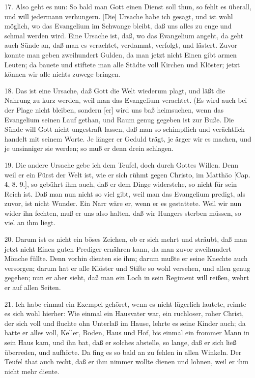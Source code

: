 17. Also geht es nun: So bald man Gott einen Dienst soll thun, so fehlt es überall, und will jedermann verhungern. [Die] Ursache habe ich gesagt, und ist wohl möglich, wo das Evangelium im Schwange bleibt, daß uns alles zu enge und schmal werden wird. Eine Ursache ist, daß, wo das Evangelium angeht, da geht auch Sünde an, daß man es verachtet, verdammt, verfolgt, und lästert. Zuvor konnte man geben zweihundert Gulden, da man jetzt nicht Einen gibt armen Leuten; da bauete und stiftete man alle Städte voll Kirchen und Klöster; jetzt können wir alle nichts zuwege bringen.

18. Das ist eine Ursache, daß Gott die Welt wiederum plagt, und läßt die Nahrung zu kurz werden, weil man das Evangelium verachtet. (Es wird auch bei der Plage nicht bleiben, sondern [er] wird uns baß heimsuchen, wenn das Evangelium seinen Lauf gethan, und Raum genug gegeben ist zur Buße. Die Sünde will Gott nicht ungestraft lassen, daß man so schimpflich und verächtlich handelt mit seinem Worte. Je länger er Geduld trägt, je ärger wir es machen, und je unsinniger sie werden; so muß er denn drein schlagen.

19. Die andere Ursache gebe ich dem Teufel, doch durch Gottes Willen. Denn weil er ein Fürst der Welt ist, wie er sich rühmt gegen Christo, im Matthäo [Cap. 4, 8. 9.], so gebührt ihm auch, daß er dem Dinge widerstehe, so nicht für sein Reich ist. Daß man nun nicht so viel gibt, weil man das Evangelium predigt, als zuvor, ist nicht Wunder. Ein Narr wäre er, wenn er es gestattete. Weil wir nun wider ihn fechten, muß er uns also halten, daß wir Hungers sterben müssen, so viel an ihm liegt.

20. Darum ist es nicht ein böses Zeichen, ob er sich mehrt und sträubt, daß man jetzt nicht Einen guten Prediger ernähren kann, da man zuvor zweihundert Mönche füllte. Denn vorhin dienten sie ihm; darum mußte er seine Knechte auch versorgen; darum hat er alle Klöster und Stifte so wohl versehen, und allen genug gegeben; nun er aber sieht, daß man ein Loch in sein Regiment will reißen, wehrt er auf allen Seiten.

21. Ich habe einmal ein Exempel gehöret, wenn es nicht lügerlich lautete, reimte es sich wohl hierher: Wie einmal ein Hausvater war,
ein ruchloser, roher Christ, der sich voll und fluchte ohn Unterlaß im Hause, lehrte es seine Kinder auch; da hatte er alles voll, Keller, Boden, Haus und Hof, bis einmal ein frommer Mann in sein Haus kam, und ihn bat, daß er solches abstelle, so lange, daß er sich ließ überreden, und aufhörte. Da fing es so bald an zu fehlen in allen Winkeln. Der Teufel that auch recht, daß er ihm nimmer wollte dienen und lohnen, weil er ihm nicht mehr diente.

